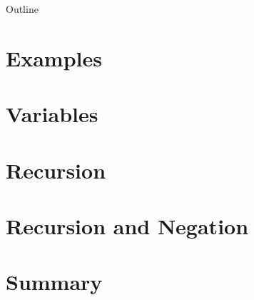 \newcommand{\myinput}[1]{
\ifx\inlibrary\undefined
  
\else
  
\fi
}

\myinput{ezasp/macros}
\myinput{ezasp/summary}
\myinput{ezasp/motivation}
\begin{frame}{Outline}
  \medskip
  \tableofcontents
\end{frame}
\section{Examples}
\myinput{ezasp/example1}
\myinput{ezasp/example2}
\section{Variables}
\myinput{ezasp/example3}
\myinput{ezasp/example4}
\section{Recursion}
\myinput{ezasp/example5}
\myinput{ezasp/example6}
\myinput{ezasp/traveling}
\myinput{ezasp/oddeven}
\section{Recursion and Negation}
\myinput{ezasp/negative}
\section{Summary}
\myinput{ezasp/whatisleft}
%
%
%
%
